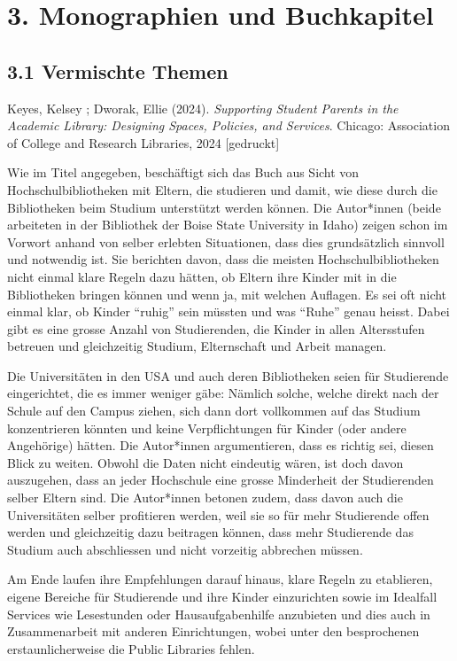\documentclass[a4paper,
fontsize=11pt,
oneside,
numbers=noperiodatend,
parskip=half-,
bibliography=totoc,
final
]{scrartcl}
\begin{document}
\section{3. Monographien und
Buchkapitel}\label{monographien-und-buchkapitel}

\subsection{3.1 Vermischte Themen}\label{vermischte-themen-1}

Keyes, Kelsey ; Dworak, Ellie (2024). \emph{Supporting Student Parents
in the Academic Library: Designing Spaces, Policies, and Services}.
Chicago: Association of College and Research Libraries, 2024
{[}gedruckt{]}

Wie im Titel angegeben, beschäftigt sich das Buch aus Sicht von
Hochschulbibliotheken mit Eltern, die studieren und damit, wie diese
durch die Bibliotheken beim Studium unterstützt werden können. Die
Autor*innen (beide arbeiteten in der Bibliothek der Boise State
University in Idaho) zeigen schon im Vorwort anhand von selber erlebten
Situationen, dass dies grundsätzlich sinnvoll und notwendig ist. Sie
berichten davon, dass die meisten Hochschulbibliotheken nicht einmal
klare Regeln dazu hätten, ob Eltern ihre Kinder mit in die Bibliotheken
bringen können und wenn ja, mit welchen Auflagen. Es sei oft nicht
einmal klar, ob Kinder \enquote{ruhig} sein müssten und was
\enquote{Ruhe} genau heisst. Dabei gibt es eine grosse Anzahl von
Studierenden, die Kinder in allen Altersstufen betreuen und gleichzeitig
Studium, Elternschaft und Arbeit managen.

Die Universitäten in den USA und auch deren Bibliotheken seien für
Studierende eingerichtet, die es immer weniger gäbe: Nämlich solche,
welche direkt nach der Schule auf den Campus ziehen, sich dann dort
vollkommen auf das Studium konzentrieren könnten und keine
Verpflichtungen für Kinder (oder andere Angehörige) hätten. Die
Autor*innen argumentieren, dass es richtig sei, diesen Blick zu weiten.
Obwohl die Daten nicht eindeutig wären, ist doch davon auszugehen, dass
an jeder Hochschule eine grosse Minderheit der Studierenden selber
Eltern sind. Die Autor*innen betonen zudem, dass davon auch die
Universitäten selber profitieren werden, weil sie so für mehr
Studierende offen werden und gleichzeitig dazu beitragen können, dass
mehr Studierende das Studium auch abschliessen und nicht vorzeitig
abbrechen müssen.

Am Ende laufen ihre Empfehlungen darauf hinaus, klare Regeln zu
etablieren, eigene Bereiche für Studierende und ihre Kinder einzurichten
sowie im Idealfall Services wie Lesestunden oder Hausaufgabenhilfe
anzubieten und dies auch in Zusammenarbeit mit anderen Einrichtungen,
wobei unter den besprochenen erstaunlicherweise die Public Libraries
fehlen.
\end{document}
